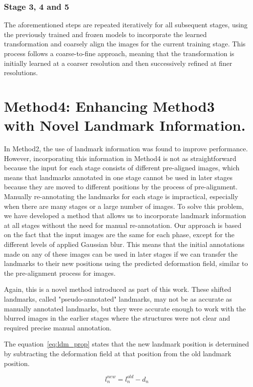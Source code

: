 \documentclass{report}
\begin{document}
	\subsubsection{Stage 3, 4 and 5}
	The aforementioned steps are repeated iteratively for all subsequent stages, using the previously trained and frozen models to incorporate the learned transformation and coarsely align the images for the current training stage. This process follows a coarse-to-fine approach, meaning that the transformation is initially learned at a coarser resolution and then successively refined at finer resolutions.
	
	\section{Method4: Enhancing Method3 with Novel Landmark Information.}
	In Method2, the use of landmark information was found to improve performance. However, incorporating this information in Method4 is not as straightforward because the input for each stage consists of different pre-aligned images, which means that landmarks annotated in one stage cannot be used in later stages because they are moved to different positions by the process of pre-alignment. Manually re-annotating the landmarks for each stage is impractical, especially when there are many stages or a large number of images. To solve this problem, we have developed a method that allows us to incorporate landmark information at all stages without the need for manual re-annotation. Our approach is based on the fact that the input images are the same for each phase, except for the different levels of applied Gaussian blur. This means that the initial annotations made on any of these images can be used in later stages if we can transfer the landmarks to their new positions using the predicted deformation field, similar to the pre-alignment process for images.
	
	Again, this is a novel method introduced as part of this work. These shifted landmarks, called "pseudo-annotated" landmarks, may not be as accurate as manually annotated landmarks, but they were accurate enough to work with the blurred images in the earlier stages where the structures were not clear and required precise manual annotation.
	
	The equation~\ref{eq:ldm_prop} states that the new landmark position is determined by subtracting the deformation field at that position from the old landmark position.
	
	\begin{equation}\label{eq:ldm_prop}
		l_n^{new} = l_n^{old} - d_n
	\end{equation}
	
\end{document}
